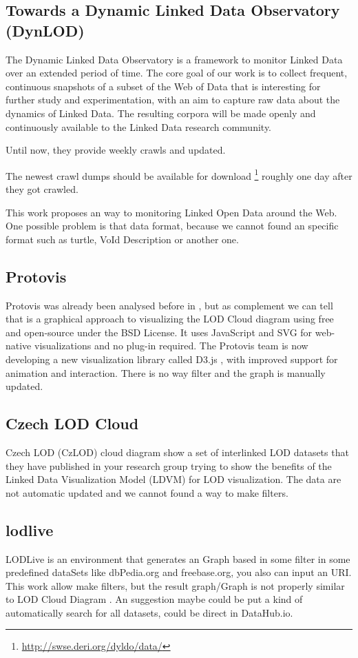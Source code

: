 \subsection{Towards a Dynamic Linked Data Observatory (DynLOD)}
The Dynamic Linked Data Observatory \cite{dynlod} is a framework to monitor Linked Data over an extended period of time. The core goal of our work is to collect frequent, continuous snapshots of a subset of the Web of Data that is interesting for further study and experimentation, with an aim to capture raw data about the dynamics of Linked Data. The resulting corpora will be made openly and continuously available to the Linked Data research community.

Until now, they provide weekly crawls and updated.

The newest crawl dumps should be available for download \footnote{\url{http://swse.deri.org/dyldo/data/}} roughly one day after they got crawled.

This work \cite{dynlod} proposes an way to monitoring Linked Open Data around the Web.
One possible problem is that data format, because we cannot found an specific format such as turtle, VoId Description or another one.

\subsection{Protovis} 
Protovis \cite{Protovis} was already been analysed before in \cite{SurveyLODDiagram1}, but as complement we can tell that is a graphical approach to visualizing the LOD Cloud diagram using free and open-source under the BSD License. It uses JavaScript and SVG for web-native visualizations and no plug-in required.
The Protovis team is now developing a new visualization library called D3.js \cite{d3js}, with improved support for animation and interaction.
There is no way filter and the graph is manually updated.

\subsection{Czech LOD Cloud}
Czech LOD (CzLOD) cloud diagram \cite{app24} show a set of interlinked LOD datasets that they have published in your research group trying to show the benefits of the Linked Data Visualization Model (LDVM) for LOD visualization.
The data are not automatic updated and we cannot found a way to make filters.

\subsection{lodlive} 
LODLive \cite{lodlive1} is an environment that generates an Graph based in some filter in some predefined dataSets like dbPedia.org and freebase.org, you also can input an URI.
This work allow make filters, but the result graph/Graph is not properly similar to LOD Cloud Diagram \cite{lodcloud}.
An suggestion maybe could be put a kind of automatically search for all datasets, could be direct in DataHub.io.

